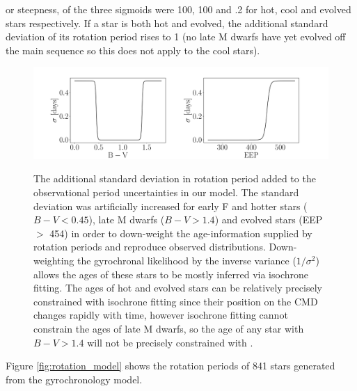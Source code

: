 or steepness, of the three sigmoids were 100, 100 and .2 for hot, cool and
evolved stars respectively.
If a star is both hot and evolved, the additional standard deviation of its
rotation period rises to 1 (no late M dwarfs have yet evolved off the main
sequence so this does not apply to the cool stars).
\begin{figure}
  \caption{
    The additional standard deviation in rotation period added to the
    observational period uncertainties in our model.
    The standard deviation was artificially increased for early F and hotter
    stars ($B-V < 0.45$), late M dwarfs ($B-V > 1.4$) and evolved stars
    (EEP $>$ 454) in order to down-weight the age-information supplied by
    rotation periods and reproduce observed distributions.
    Down-weighting the gyrochronal likelihood by the inverse variance
    ($1/\sigma^2$) allows the ages of these stars to be mostly inferred
    via isochrone fitting.
    The ages of hot and evolved stars can be relatively precisely constrained
    with isochrone fitting since their position on the CMD changes
    rapidly with time, however isochrone fitting cannot constrain the ages of
    late M dwarfs, so the age of any star with $B-V > 1.4$ will not be
    precisely constrained with \sd.
}
  \centering
    \includegraphics[width=1.\textwidth]{variance}
\label{fig:variance}
\end{figure}
Figure \ref{fig:rotation_model} shows the rotation periods of 841
stars generated from the gyrochronology model.
